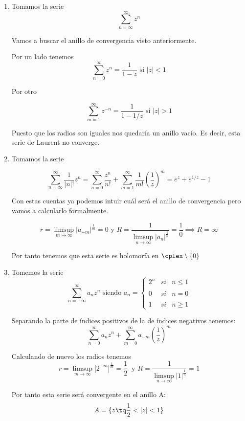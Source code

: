 \documentclass{apuntes}
\begin{document}
\begin{example}

\begin{enumerate}
\item Tomamos la serie
\[\sum_{n=\infty}^{\infty}z^n\]

Vamos a buscar el anillo de convergencia visto anteriormente.

Por un lado tenemos
\[\sum_{n=0}^{\infty}z^n = \frac{1}{1-z} \text{ si } |z| < 1\]

Por otro

\[\sum_{m=1}^{\infty}z^{-n}=\frac{1}{1-1/z} \text{ si } |z|>1\]

Puesto que los radios son iguales nos quedaría un anillo vacío. Es decir, esta serie de Laurent no converge.

\item Tomamos la serie

\[\sum_{n=\infty}^{\infty}\frac{1}{|n|!}z^n = \sum_{n=0}^{\infty}\frac{z^n}{n!} + \sum_{m=1}^{\infty}\frac{1}{m!}\left(\frac{1}{z}\right)^m = e^z +e^{1/z}-1\]

Con estas cuentas ya podemos intuir cuál será el anillo de convergencia pero vamos a calcularlo formalmente.

\[r =\limsup_{m \to \infty}|a_{-m}|^\frac{1}{m}=0 \text{ y } R = \frac{1}{\limsup_{n \to \infty}|a_{n}|^\frac{1}{n}}=\frac{1}{0} \implies R = \infty\]

Por tanto tenemos que esta serie es holomorfa en $\cplex \setminus \{0\}$

\item Tomemos la serie
\[\sum_{n=-\infty}^{\infty}a_nz^n \text{ siendo } a_n=\left\{ \begin{array}{lcc}
             2^n &   si  & n \leq 1 \\
             \\ 0 &  si & n=0 \\
             \\ 1 &  si  & n \geq 1
             \end{array}
   \right.\]

Separando la parte de índices positivos de la de índices negativos tenemos:
\[\sum_{n=0}^{\infty}a_nz^n + \sum_{m=0}^{\infty}a_{-m}\left(\frac{1}{z}\right)^m\]

Calculando de nuevo los radios tenemos
\[r = \limsup_{m \to \infty}|2^{-m}|^\frac{1}{m}=\frac{1}{2} \ \text{ y } R = \frac{1}{\limsup_{n \to \infty}|1|^\frac{1}{n}}=1 \]

Por tanto esta serie será convergente en el anillo A:
\[A= \{z \tq  \frac{1}{2}<|z|<1\} \]

\end{enumerate}
\end{example}
\end{document}
